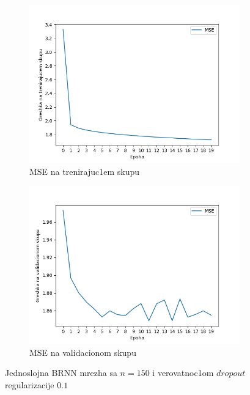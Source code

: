 \documentclass[a4paper, openany, oneside, 11pt]{book}
\begin{document}
\begin{figure}[!h]
        \centering
        \begin{subfigure}{0.475\textwidth}
            \centering
            \includegraphics[scale=0.43]{res/SL_BLSTM_150units_d01_train.png}
            \caption{\acrshort{MSE} na trenirajuc1em skupu}
            \label{fig:4_15a}
            \vspace{0pt}
        \end{subfigure}%
        \begin{subfigure}{0.475\textwidth}
            \centering
            \includegraphics[scale=0.43]{res/SL_BLSTM_150units_d01_validation.png}
            \caption{\acrshort{MSE} na validacionom skupu}
            \label{fig:4_15b}
            \vspace{0pt}
        \end{subfigure}
        \caption{Jednoslojna \acrshort{BRNN} mrezha sa $n=150$ i verovatnoc1om $dropout$ regularizacije $0.1$}
        \label{fig:4_15}
\end{figure}
\end{document}
